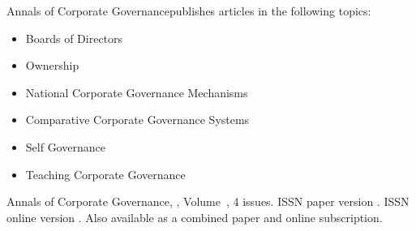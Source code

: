 


\journalaimsandscope
 {%
Annals of Corporate Governancepublishes
 articles in the following topics:
 \begin{itemize}
\item{Boards of Directors}
\item{Ownership}
\item{National Corporate Governance Mechanisms}
\item{Comparative Corporate Governance Systems}
\item{Self Governance}
\item{Teaching Corporate Governance}
\end{itemize}
 }


\journallibraryinfo
 {%
 Annals of Corporate Governance, ,
  Volume~, 4 issues.
  ISSN paper version .
  ISSN online version .
  Also available as a combined paper and online
  subscription.
 } 